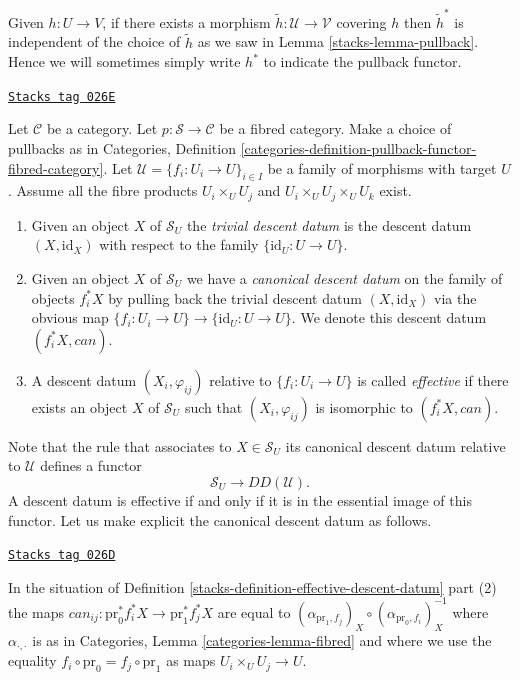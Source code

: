 Given $h : U \to V$, if there exists a morphism
$\tilde h : \mathcal{U} \to \mathcal{V}$ covering $h$
then $\tilde h^*$ is independent of the choice of
$\tilde h$ as we saw in Lemma \ref{stacks-lemma-pullback}.
Hence we will sometimes simply write $h^*$ to indicate
the pullback functor.

\begin{definition}
\label{stacks-definition-effective-descent-datum}
\href{https://stacks.math.columbia.edu/tag/026E}{\texttt{Stacks tag 026E}}

Let $\mathcal{C}$ be a category.
Let $p : \mathcal{S} \to \mathcal{C}$ be a fibred category.
Make a choice of pullbacks as in Categories,
Definition \ref{categories-definition-pullback-functor-fibred-category}.
Let $\mathcal{U} = \{f_i : U_i \to U\}_{i \in I}$ be a family of morphisms
with target $U$. Assume all the fibre products
$U_i \times_U U_j$ and $U_i \times_U U_j \times_U U_k$ exist.
\begin{enumerate}
\item Given an object $X$ of $\mathcal{S}_U$ the {\it trivial descent datum}
is the descent datum $(X, \text{id}_X)$ with respect to the family
$\{\text{id}_U : U \to U\}$.
\item Given an object $X$ of $\mathcal{S}_U$
we have a {\it canonical descent datum} on the family of
objects $f_i^*X$ by pulling back the trivial
descent datum $(X, \text{id}_X)$ via the
obvious map $\{f_i : U_i \to U\} \to \{\text{id}_U : U \to U\}$.
We denote this descent datum $(f_i^*X, can)$.
\item A descent datum $(X_i, \varphi_{ij})$
relative to $\{f_i : U_i \to U\}$ is called {\it effective}
if there exists an object $X$ of $\mathcal{S}_U$ such that
$(X_i, \varphi_{ij})$ is isomorphic to $(f_i^*X, can)$.
\end{enumerate}
\end{definition}

Note that the rule that associates to $X \in \mathcal{S}_U$ its
canonical descent datum relative to $\mathcal{U}$ defines a
functor
$$
\mathcal{S}_U \longrightarrow DD(\mathcal{U}).
$$
A descent datum is effective if and only if it is in the essential
image of this functor.
Let us make explicit the canonical descent datum as follows.

\begin{lemma}
\label{stacks-lemma-trivial-cocycle}
\href{https://stacks.math.columbia.edu/tag/026D}{\texttt{Stacks tag 026D}}

In the situation of
Definition \ref{stacks-definition-effective-descent-datum} part (2) the maps
$can_{ij} : \text{pr}_0^*f_i^*X \to \text{pr}_1^*f_j^*X$ are equal to
$(\alpha_{\text{pr}_1, f_j})_X \circ (\alpha_{\text{pr}_0, f_i})_X^{-1}$
where $\alpha_{\cdot, \cdot}$ is as in
Categories, Lemma \ref{categories-lemma-fibred}
and where we
use the equality $f_i \circ \text{pr}_0 = f_j \circ \text{pr}_1$
as maps $U_i \times_U U_j \to U$.
\end{lemma}

